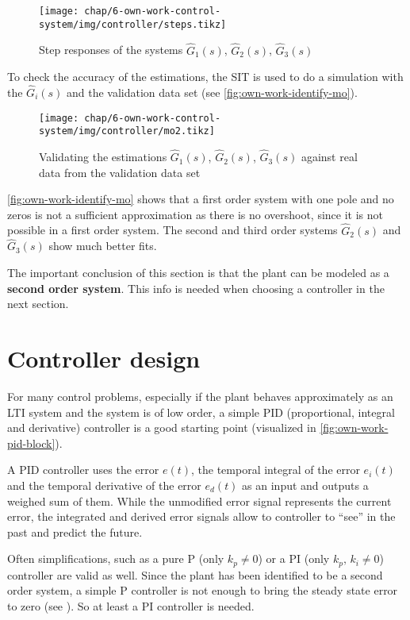 \begin{figure}[tb]
	\centering
	\texttt{[image: chap/6-own-work-control-system/img/controller/steps.tikz]}
	\caption{Step responses of the systems $\hat{G}_1(s)$, $\hat{G}_2(s)$, $\hat{G}_3(s)$}
	\label{fig:own-work-identify-step}
\end{figure}

To check the accuracy of the estimations, the SIT is used to do a simulation with the $\hat{G}_i(s)$ and the validation data set (see \autoref{fig:own-work-identify-mo}).

\begin{figure}[tb]
	\centering
	\texttt{[image: chap/6-own-work-control-system/img/controller/mo2.tikz]}
	\caption{Validating the estimations $\hat{G}_1(s)$, $\hat{G}_2(s)$, $\hat{G}_3(s)$ against real data from the validation data set}
	\label{fig:own-work-identify-mo}
\end{figure}

\autoref{fig:own-work-identify-mo} shows that a first order system with one pole and no zeros is not a sufficient approximation as there is no overshoot, since it is not possible in a first order system. The second and third order systems $\hat{G}_2(s)$ and $\hat{G}_3(s)$ show much better fits.

The important conclusion of this section is that the plant can be modeled as a \textbf{second order system}. This info is needed when choosing a controller in the next section.

\FloatBarrier
\section{Controller design}
For many control problems, especially if the plant behaves approximately as an LTI system and the system is of low order, a simple PID (proportional, integral and derivative) controller is a good starting point (visualized in \autoref{fig:own-work-pid-block}). 

A PID controller uses the error $e(t)$, the temporal integral of the error $e_i(t)$ and the temporal derivative of the error $e_d(t)$ as an input and outputs a weighed sum of them. While the unmodified error signal represents the current error, the integrated and derived error signals allow to controller to ``see'' in the past and predict the future.

Often simplifications, such as a pure P (only $k_p \neq 0$) or a PI (only $k_p,\,k_i \neq 0$) controller are valid as well. Since the plant has been identified to be a second order system, a simple P controller is not enough to bring the steady state error to zero (see ). So at least a PI controller is needed.

